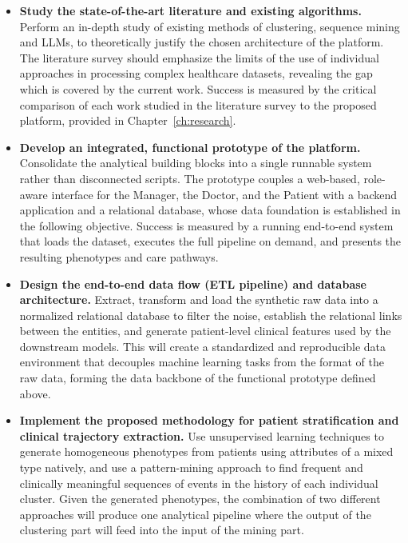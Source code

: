 \begin{itemize}
    \item[\textbf{I.}] \textbf{Study the state-of-the-art literature and existing algorithms.} Perform an in-depth study of existing methods of clustering, sequence mining and LLMs, to theoretically justify the chosen architecture of the platform. The literature survey should emphasize the limits of the use of individual approaches in processing complex healthcare datasets, revealing the gap which is covered by the current work. Success is measured by the critical comparison of each work studied in the literature survey to the proposed platform, provided in Chapter~\ref{ch:research}.

    \item[\textbf{II.}] \textbf{Develop an integrated, functional prototype of the platform.} Consolidate the analytical building blocks into a single runnable system rather than disconnected scripts. The prototype couples a web-based, role-aware interface for the Manager, the Doctor, and the Patient with a backend application and a relational database, whose data foundation is established in the following objective. Success is measured by a running end-to-end system that loads the dataset, executes the full pipeline on demand, and presents the resulting phenotypes and care pathways.

    \item[\textbf{III.}] \textbf{Design the end-to-end data flow (ETL pipeline) and database architecture.} Extract, transform and load the synthetic raw data into a normalized relational database to filter the noise, establish the relational links between the entities, and generate patient-level clinical features used by the downstream models. This will create a standardized and reproducible data environment that decouples machine learning tasks from the format of the raw data, forming the data backbone of the functional prototype defined above.

    \item[\textbf{IV.}] \textbf{Implement the proposed methodology for patient stratification and clinical trajectory extraction.} Use unsupervised learning techniques to generate homogeneous phenotypes from patients using attributes of a mixed type natively, and use a pattern-mining approach to find frequent and clinically meaningful sequences of events in the history of each individual cluster. Given the generated phenotypes, the combination of two different approaches will produce one analytical pipeline where the output of the clustering part will feed into the input of the mining part.


\end{itemize}
